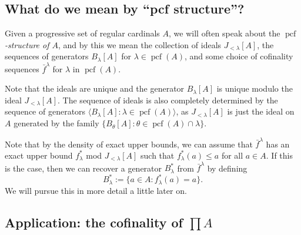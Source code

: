 \documentclass[10pt]{amsart}
\theoremstyle{plain}
\theoremstyle{definition}
\theoremstyle{remark}
\DeclareMathOperator{\pcf}{pcf}
\numberwithin{equation}{section}
\begin{document}
\subsection{What do we mean by ``pcf structure''?}

Given a progressive set of regular cardinals $A$, we will often speak about the {\em $\pcf$-structure of $A$}, and by this we mean  the collection of ideals $J_{<\lambda}[A]$, the sequences of generators $B_\lambda[A]$ for $\lambda\in\pcf(A)$, and some choice of cofinality sequences $\bar{f}^\lambda$ for $\lambda$ in $\pcf(A)$.

Note that the ideals are unique and the generator $B_\lambda[A]$ is unique modulo the ideal $J_{<\lambda}[A]$.  The sequence of ideals is also completely determined by the sequence of generators $\langle B_\lambda[A]:\lambda\in\pcf(A)\rangle$, as $J_{<\lambda}[A]$ is just the ideal on $A$ generated by the family $\{B_\theta[A]:\theta\in\pcf(A)\cap\lambda\}$.

Note that by the density of exact upper bounds, we can assume that $\bar{f}^\lambda$ has an exact upper bound $f^*_\lambda$ mod $J_{<\lambda}[A]$ such that $f_\lambda^*(a)\leq a$ for all $a\in A$.  If this is the case, then we can recover a generator $B^*_\lambda$ from $\bar{f}^\lambda$ by defining
\begin{equation}
B^*_\lambda:=\{a\in A: f^*_\lambda(a) = a\}.
\end{equation}
We will pursue this in more detail a little later on.


\subsection{Application: the cofinality of $\prod A$}
\end{document}

